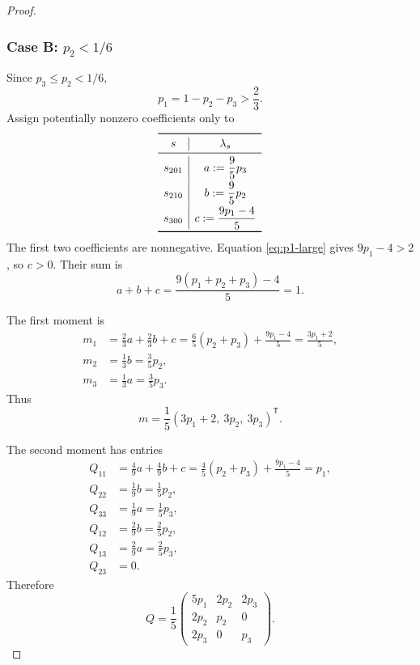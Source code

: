 \documentclass[11pt]{article}
\theoremstyle{definition}
\theoremstyle{remark}
\begin{document}
\begin{proof}
\subsubsection*{Case B: $p_2<1/6$}
Since $p_3\le p_2<1/6$,
\begin{equation}
p_1=1-p_2-p_3>\frac23.
\label{eq:p1-large}
\end{equation}
Assign potentially nonzero coefficients only to
\begin{equation}
\begin{array}{c|c}
\toprule
s&\lambda_s\\
\midrule
s_{201}&a:=\dfrac95p_3\\[2mm]
s_{210}&b:=\dfrac95p_2\\[2mm]
s_{300}&c:=\dfrac{9p_1-4}{5}\\
\bottomrule
\end{array}
\label{eq:case-B-weights}
\end{equation}
The first two coefficients are nonnegative.  Equation \eqref{eq:p1-large} gives $9p_1-4>2$, so $c>0$.  Their sum is
\[
a+b+c=\frac{9(p_1+p_2+p_3)-4}{5}=1.
\]

The first moment is
\begin{align*}
m_1
&=\frac23a+\frac23b+c
=\frac65(p_2+p_3)+\frac{9p_1-4}{5}
=\frac{3p_1+2}{5},\\
m_2&=\frac13b=\frac35p_2,\\
m_3&=\frac13a=\frac35p_3.
\end{align*}
Thus
\begin{equation}
m=\frac15(3p_1+2,\ 3p_2,\ 3p_3)^{\mathsf T}.
\label{eq:case-B-m}
\end{equation}

The second moment has entries
\begin{align*}
Q_{11}
&=\frac49a+\frac49b+c
=\frac45(p_2+p_3)+\frac{9p_1-4}{5}=p_1,\\
Q_{22}&=\frac19b=\frac15p_2,\\
Q_{33}&=\frac19a=\frac15p_3,\\
Q_{12}&=\frac29b=\frac25p_2,\\
Q_{13}&=\frac29a=\frac25p_3,\\
Q_{23}&=0.
\end{align*}
Therefore
\begin{equation}
Q=\frac15
\begin{pmatrix}
5p_1&2p_2&2p_3\\
2p_2&p_2&0\\
2p_3&0&p_3
\end{pmatrix}.
\label{eq:case-B-Q}
\end{equation}


\end{proof}
\end{document}
